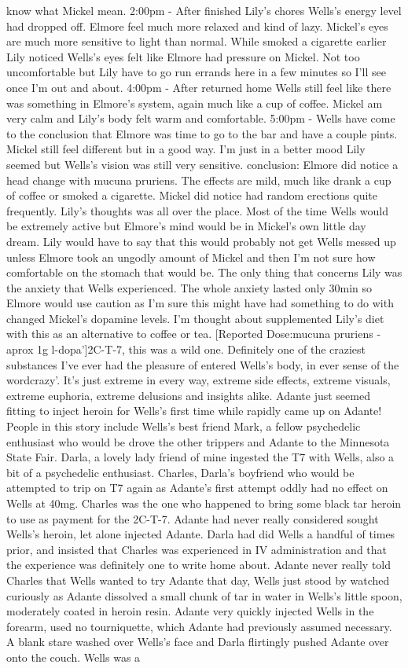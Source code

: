 \documentclass[12pt]{book}
\begin{document}
know what Mickel mean. 2:00pm - After finished Lily's chores Wells's energy level had dropped off. Elmore feel much more relaxed and kind of lazy. Mickel's eyes are much more sensitive to light than normal. While smoked a cigarette earlier Lily noticed Wells's eyes felt like Elmore had pressure on Mickel. Not too uncomfortable but Lily have to go run errands here in a few minutes so I'll see once I'm out and about. 4:00pm - After returned home Wells still feel like there was something in Elmore's system, again much like a cup of coffee. Mickel am very calm and Lily's body felt warm and comfortable. 5:00pm - Wells have come to the conclusion that Elmore was time to go to the bar and have a couple pints. Mickel still feel different but in a good way. I'm just in a better mood Lily seemed but Wells's vision was still very sensitive. conclusion: Elmore did notice a head change with mucuna pruriens. The effects are mild, much like drank a cup of coffee or smoked a cigarette. Mickel did notice had random erections quite frequently. Lily's thoughts was all over the place. Most of the time Wells would be extremely active but Elmore's mind would be in Mickel's own little day dream. Lily would have to say that this would probably not get Wells messed up unless Elmore took an ungodly amount of Mickel and then I'm not sure how comfortable on the stomach that would be. The only thing that concerns Lily was the anxiety that Wells experienced. The whole anxiety lasted only 30min so Elmore would use caution as I'm sure this might have had something to do with changed Mickel's dopamine levels. I'm thought about supplemented Lily's diet with this as an alternative to coffee or tea. [Reported Dose:mucuna pruriens - aprox 1g l-dopa']2C-T-7, this was a wild one. Definitely one of the craziest substances I've ever had the pleasure of entered Wells's body, in ever sense of the wordcrazy'. It's just extreme in every way, extreme side effects, extreme visuals, extreme euphoria, extreme delusions and insights alike. Adante just seemed fitting to inject heroin for Wells's first time while rapidly came up on Adante! People in this story include Wells's best friend Mark, a fellow psychedelic enthusiast who would be drove the other trippers and Adante to the Minnesota State Fair. Darla, a lovely lady friend of mine ingested the T7 with Wells, also a bit of a psychedelic enthusiast. Charles, Darla's boyfriend who would be attempted to trip on T7 again as Adante's first attempt oddly had no effect on Wells at 40mg. Charles was the one who happened to bring some black tar heroin to use as payment for the 2C-T-7. Adante had never really considered sought Wells's heroin, let alone injected Adante. Darla had did Wells a handful of times prior, and insisted that Charles was experienced in IV administration and that the experience was definitely one to write home about. Adante never really told Charles that Wells wanted to try Adante that day, Wells just stood by watched curiously as Adante dissolved a small chunk of tar in water in Wells's little spoon, moderately coated in heroin resin. Adante very quickly injected Wells in the forearm, used no tourniquette, which Adante had previously assumed necessary. A blank stare washed over Wells's face and Darla flirtingly pushed Adante over onto the couch. Wells was a 
\end{document}
